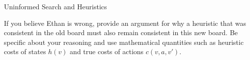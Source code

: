 \begin{problem}{Uninformed Search and Heuristics}
\begin{question}
\begin{subquestion}[8]
\vspace{0.5em}
\hrulefill
\vspace{0.5em}


If you believe Ethan is wrong, provide an argument for why a heuristic that was consistent in the old board must also remain consistent in this new board. Be specific about your reasoning and use mathematical quantities such as heuristic costs of states $h(v)$ and true costs of actions $c(v,a,v')$.


\end{subquestion}


\end{question}

\end{problem}